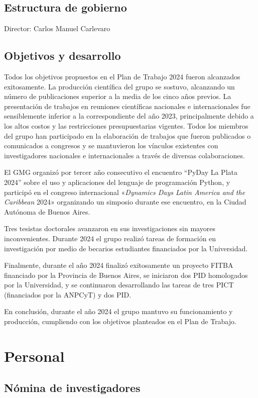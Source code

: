 \documentclass[a4paper,11pt,twoside,final,titlepage,onecolumn,openright]{report}
\begin{document}
\subsection{Estructura de gobierno}
Director: Carlos Manuel Carlevaro

\subsection{Objetivos y desarrollo}

Todos los objetivos propuestos en el Plan de Trabajo 2024 fueron alcanzados exitosamente. La producción científica del grupo se sostuvo, alcanzando un número de publicaciones superior a la media de los cinco años previos. La presentación de trabajos en reuniones científicas nacionales e internacionales fue sensiblemente inferior a la correspondiente del año 2023, principalmente debido a los altos costos y las restricciones presupuestarias vigentes. Todos los miembros del grupo han participado en la elaboración de trabajos que fueron publicados o comunicados a congresos y se mantuvieron los vínculos existentes con investigadores nacionales e internacionales a través de diversas colaboraciones.

El GMG organizó por tercer año consecutivo el encuentro ``PyDay La Plata 2024'' sobre el uso y aplicaciones del lenguaje de programación Python, y participó en el congreso internacional «\textit{Dynamics Days Latin America and the Caribbean} 2024» organizando un simposio durante ese encuentro, en la Ciudad Autónoma de Buenos Aires.

Tres tesistas doctorales avanzaron en sus investigaciones sin mayores inconvenientes. Durante 2024 el grupo realizó tareas de formación en investigación por medio de becarios estudiantes financiados por la Universidad.

Finalmente, durante el año 2024 finalizó exitosamente un proyecto FITBA financiado por la Provincia de Buenos Aires, se iniciaron dos PID homologados por la Universidad, y se continuaron desarrollando las tareas de tres PICT (financiados por la ANPCyT) y dos PID.

En conclusión, durante el año 2024 el grupo mantuvo su funcionamiento y producción, cumpliendo con los objetivos planteados en el Plan de Trabajo.

\section{Personal}

\subsection{Nómina de investigadores}
\end{document}
